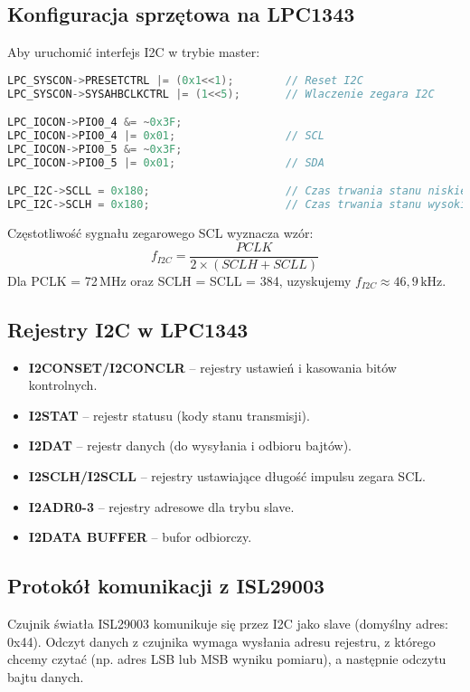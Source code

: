 \documentclass[letterpaper,11pt]{report}
\begin{document}
\subsection{Konfiguracja sprzętowa na LPC1343}

Aby uruchomić interfejs I2C w trybie master:
\begin{lstlisting}[language=C]
LPC_SYSCON->PRESETCTRL |= (0x1<<1);        // Reset I2C
LPC_SYSCON->SYSAHBCLKCTRL |= (1<<5);       // Wlaczenie zegara I2C

LPC_IOCON->PIO0_4 &= ~0x3F;
LPC_IOCON->PIO0_4 |= 0x01;                 // SCL
LPC_IOCON->PIO0_5 &= ~0x3F;
LPC_IOCON->PIO0_5 |= 0x01;                 // SDA

LPC_I2C->SCLL = 0x180;                     // Czas trwania stanu niskiego SCL
LPC_I2C->SCLH = 0x180;                     // Czas trwania stanu wysokiego SCL
\end{lstlisting}

Częstotliwość sygnału zegarowego SCL wyznacza wzór:
\[
f_{I2C} = \frac{PCLK}{2 \times (SCLH + SCLL)}
\]
Dla PCLK = 72\,MHz oraz SCLH = SCLL = 384, uzyskujemy \(f_{I2C} \approx 46,9\,\mathrm{kHz}\).

\subsection{Rejestry I2C w LPC1343}

\begin{itemize}
    \item \textbf{I2CONSET/I2CONCLR} – rejestry ustawień i kasowania bitów kontrolnych.
    \item \textbf{I2STAT} – rejestr statusu (kody stanu transmisji).
    \item \textbf{I2DAT} – rejestr danych (do wysyłania i odbioru bajtów).
    \item \textbf{I2SCLH/I2SCLL} – rejestry ustawiające długość impulsu zegara SCL.
    \item \textbf{I2ADR0-3} – rejestry adresowe dla trybu slave.
    \item \textbf{I2DATA BUFFER} – bufor odbiorczy.
\end{itemize}

\subsection{Protokół komunikacji z ISL29003}

Czujnik światła ISL29003 komunikuje się przez I2C jako slave (domyślny adres: 0x44). Odczyt danych z czujnika wymaga wysłania adresu rejestru, z którego chcemy czytać (np. adres LSB lub MSB wyniku pomiaru), a następnie odczytu bajtu danych.
\end{document}
